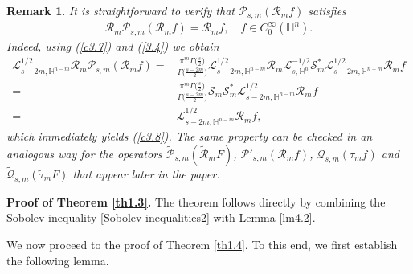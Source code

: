 \documentclass[12pt,reqno]{amsart}%
\theoremstyle{plain}
\newtheorem{remark}{Remark}[section]
\numberwithin{equation}{section}
\begin{document}
\begin{remark}
It is straightforward to verify that \(\mathcal{P}_{s,m}(\mathcal{R}_{m}f)\) satisfies
\begin{align}\label{c3.8}
\mathcal{R}_{m}\mathcal{P}_{s,m}(\mathcal{R}_{m}f)=\mathcal{R}_{m}f,\quad f \in C_{0}^{\infty}(\mathbb{H}^{n}).
\end{align}
Indeed, using (\ref{c3.7}) and (\ref{3.4}) we obtain
\begin{align*}
\mathcal{L}_{s-2m,\mathbb{H}^{n-m}}^{1/2} \mathcal{R}_{m}\mathcal{P}_{s,m}(\mathcal{R}_{m}f)=&\frac{\pi^{m}\Gamma\bigl(\frac{s}{2}\bigr)}{\Gamma\bigl(\frac{s-2m}{2}\bigr)}
\mathcal{L}_{s-2m,\mathbb{H}^{n-m}}^{1/2} \mathcal{R}_{m}\mathcal{L}_{s,\mathbb{H}^{n}}^{-1/2}\mathcal{S}_{m}^{\ast}
\mathcal{L}_{s-2m,\mathbb{H}^{n-m}}^{1/2}\mathcal{R}_{m}f\\
=&\frac{\pi^{m}\Gamma\bigl(\frac{s}{2}\bigr)}{\Gamma\bigl(\frac{s-2m}{2}\bigr)}\mathcal{S}_{m}\mathcal{S}_{m}^{*}\mathcal{L}_{s-2m,\mathbb{H}^{n-m}}^{1/2}\mathcal{R}_{m}f\\
=&\mathcal{L}_{s-2m,\mathbb{H}^{n-m}}^{1/2}\mathcal{R}_{m}f,
\end{align*}
which immediately yields (\ref{c3.8}).
The same property can be checked in an analogous way for the operators \(\widetilde{\mathcal{P}}_{s,m}(\widetilde{\mathcal{R}}_{m}F)\), \(\mathcal{P}'_{s,m}(\mathcal{R}_{m}f)\),  \(\mathcal{Q}_{s,m}(\tau_{m}f)\) and $\widetilde{\mathcal{Q}}_{s,m}(\widetilde{\tau}_{m}F)$ that appear later in the paper.
\end{remark}

\textbf{Proof of Theorem \ref{th1.3}.} The theorem follows directly by combining the Sobolev inequality \eqref{Sobolev inequalities2} with Lemma \ref{lm4.2}.

\vspace{0.2cm}


We now proceed to the proof of Theorem \ref{th1.4}. To this end, we first establish the following lemma.
\end{document}
